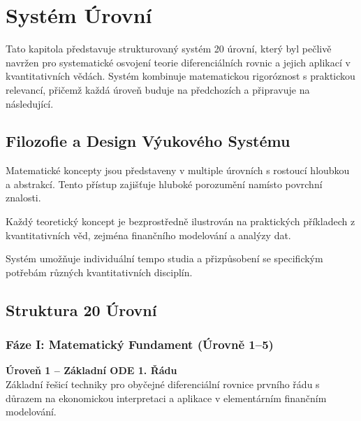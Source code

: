 \section{Systém Úrovní}
\label{sec:system-levels}

Tato kapitola představuje strukturovaný systém 20 úrovní, který byl pečlivě navržen pro systematické osvojení teorie diferenciálních rovnic a jejich aplikací v kvantitativních vědách. Systém kombinuje matematickou rigoróznost s praktickou relevancí, přičemž každá úroveň buduje na předchozích a připravuje na následující.

\subsection{Filozofie a Design Výukového Systému}

\begin{principle}
Matematické koncepty jsou představeny v multiple úrovních s rostoucí hloubkou a abstrakcí. Tento přístup zajišťuje hluboké porozumění namísto povrchní znalosti.
\end{principle}

\begin{principle}
Každý teoretický koncept je bezprostředně ilustrován na praktických příkladech z kvantitativních věd, zejména finančního modelování a analýzy dat.
\end{principle}

\begin{principle}
Systém umožňuje individuální tempo studia a přizpůsobení se specifickým potřebám různých kvantitativních disciplín.
\end{principle}

\subsection{Struktura 20 Úrovní}

\subsubsection{Fáze I: Matematický Fundament (Úrovně 1–5)}

\textbf{Úroveň 1 – Základní ODE 1. Řádu}\\
Základní řešicí techniky pro obyčejné diferenciální rovnice prvního řádu s důrazem na ekonomickou interpretaci a aplikace v elementárním finančním modelování.

